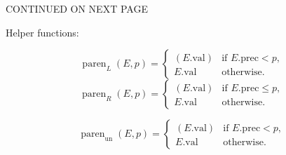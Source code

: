 \documentclass[11pt]{amsart}
\begin{document}
\begin{itemize}
CONTINUED ON NEXT PAGE

\newpage

Helper functions:

\[
\operatorname{paren}_L(E,p)=
\begin{cases}
( E.\mathrm{val} ) & \text{if } E.\mathrm{prec} < p, \\
E.\mathrm{val}    & \text{otherwise.}
\end{cases}
\]
\[
\operatorname{paren}_R(E,p)=
\begin{cases}
( E.\mathrm{val} ) & \text{if } E.\mathrm{prec} \le p, \\
E.\mathrm{val}     & \text{otherwise.}
\end{cases}
\]

\[
\operatorname{paren}_{\mathrm{un}}(E,p)=
\begin{cases}
( E.\mathrm{val} ) & \text{if } E.\mathrm{prec} < p, \\
E.\mathrm{val}     & \text{otherwise.}
\end{cases}
\]

\end{itemize}
\end{document}
